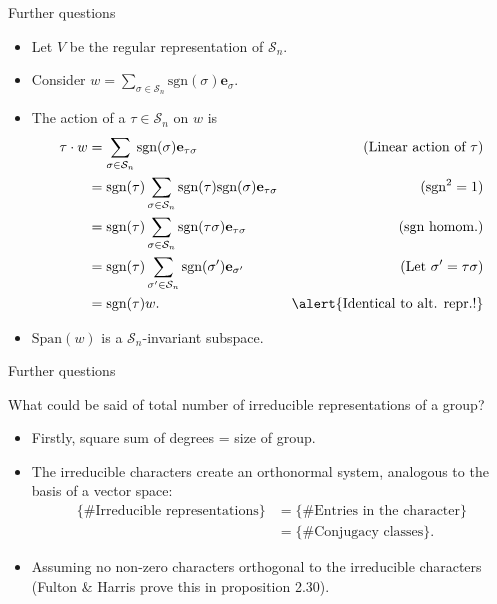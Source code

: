 \documentclass[10pt]{beamer}
\newcommand{\Sym}{\mathcal{S}}
\newcommand{\sgn}{\text{sgn}}
\newcommand{\bas}{\mathbf{e}}
\newcommand{\Span}{\text{Span}}
\begin{document}
\begin{frame}{Further questions}
	\begin{example}
		\begin{itemize}
			\item Let $V$ be the regular representation of $\Sym_n$.
			
			\item Consider $w = \sum_{\sigma \in \Sym_n} \sgn(\sigma)\bas_\sigma$.
			
			\item The action of a $\tau \in \Sym_n$ on $w$ is \begin{align*}
				\tau \cdot w &= \sum_{\sigma \in \Sym_n} \sgn(\sigma)\bas_{\tau\sigma} & \text{(Linear action of $\tau$)} \\ 
				&= \sgn(\tau)\sum_{\sigma \in \Sym_n} \sgn(\tau)\sgn(\sigma)\bas_{\tau\sigma} & \text{($\sgn^2 = 1$)}\\
				&= \sgn(\tau)\sum_{\sigma \in \Sym_n} \sgn(\tau\sigma)\bas_{\tau\sigma} & \text{(sgn homom.)} \\
				&= \sgn(\tau)\sum_{\sigma' \in \Sym_n} \sgn(\sigma')\bas_{\sigma'} & \text{(Let $\sigma' = \tau\sigma$)} \\
				&= \sgn(\tau) w. & \text{\alert{Identical to alt. repr.!}}
			\end{align*}	
			
			
			\item $\Span(w)$ is a $\Sym_n$-invariant subspace.
		\end{itemize}
		\end{example}
\end{frame}

\begin{frame}{Further questions}
	\begin{block}{What could be said of total number of irreducible representations of a group?}
		\begin{itemize}
			\item Firstly, square sum of degrees = size of group.
			
			\item The irreducible characters create an orthonormal system, analogous to the basis of a vector space:
			\begin{align*}
									\{\text{\# Irreducible representations}\} &= \{\text{\# Entries in the character}\} \\
									&= \{\text{\# Conjugacy classes}\}.
			\end{align*}
			
			\item Assuming no non-zero characters orthogonal to the irreducible characters (Fulton \& Harris prove this in proposition 2.30).
		\end{itemize}
	\end{block}
\end{frame}
\end{document}
